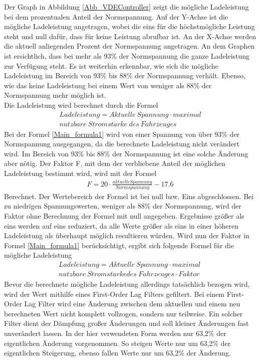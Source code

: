 Der Graph in Abbildung \ref{Abb_VDEController} zeigt die mögliche Ladeleistung bei dem prozentualen Anteil der Normspannung. Auf der Y-Achse ist die mögliche Ladeleistung angetragen, wobei die eins für die höchstmögliche Leistung steht und null dafür, dass für keine Leistung abrufbar ist. An der X-Achse werden die aktuell anliegenden Prozent der Normspannung angetragen. An dem Graphen ist ersichtlich, dass bei mehr als 93\% der Normspannung die ganze Ladeleistung zur Verfügung steht. Es ist weiterhin erkennbar, wie sich die mögliche Ladeleistung im Bereich von 93\% bis 88\% der Normspannung verhält. Ebenso, wie das keine Ladeleistung bei einem Wert von weniger als 88\% der Normspannung mehr möglich ist. \\
Die Ladeleistung wird berechnet durch die Formel
\begin{align}
	Ladeleistung = Aktuelle\ Spannung \cdot maximal \label{Main_formula1}\\
	nutzbare\ Stromst\ddot{a}rke\ des\ Fahrzeuges \nonumber
\end{align}
Bei der Formel \ref{Main_formula1} wird von einer Spannung von über 93\% der Normspannung ausgegangen, da die berechnete Ladeleistung nicht verändert wird. Im Bereich von 93\% bis 88\% der Normspannung ist eine solche Änderung aber nötig. Der Faktor F, mit dem der verbliebene Anteil der möglichen Ladeleistung bestimmt wird, wird mit der Formel \\
\begin{align}
	F = 20 \cdot \frac{aktuelle Spannung}{Normspannung} - 17.6
	\label{Main_formula2}
\end{align}
Berechnet. Der Wertebereich der Formel ist bei null bzw. Eins abgeschlossen. Bei zu niedrigen Spannungswerten, weniger als 88\% der Normspannung, wird der Faktor ohne Berechnung der Formel mit null angegeben. Ergebnisse größer als eins werden auf eins reduziert, da alle Werte größer als eins in einer höheren Ladeleistung als überhaupt möglich resultieren würden. Wird nun der Faktor in Formel \ref{Main_formula1} berücksichtigt, ergibt sich folgende Formel für die mögliche Ladeleistung
\begin{align}
	Ladeleistung = Aktuelle\ Spannung \cdot maximal\ \label{Main_formula3}\\
	nutzbare\ Stromst\ddot{a}rke des\ Fahrzeuges \cdot Faktor \nonumber
\end{align}
Bevor die berechnete mögliche Ladeleistung allerdings tatsächlich bezogen wird, wird der Wert mithilfe eines First-Order Lag Filters gefiltert. Bei einem First-Order Lag Filter wird eine Änderung zwischen dem aktuellen und einem neu berechneten Wert nicht komplett vollzogen, sondern nur teilweise. Ein solcher Filter dient der Dämpfung großer Änderungen und soll kleiner Änderungen fast unverändert lassen. In der hier verwendeten Form werden nur 63,2\% der eigentlichen Änderung vorgenommen. So steigen Werte nur um 63,2\% der eigentlichen Steigerung, ebenso fallen Werte nur um 63,2\% der Änderung.
